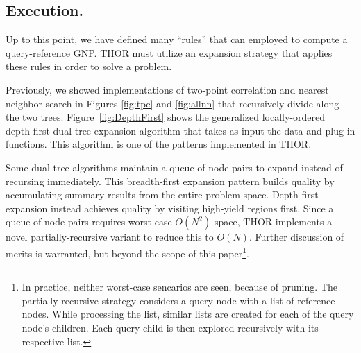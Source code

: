 \documentclass[twoside,leqno,twocolumn]{article}
\newcommand{\summary}{\delta}
\newcommand{\fig}[1]{Figure~\ref{fig:#1}}
\newcommand{\mysub}[1]{\subsection{#1.}}
\newcommand{\lettermu}{e}
\newcommand{\deltamu}{\summary_{\lettermu}}
\begin{document}

\mysub{Execution}

Up to this point, we have defined many ``rules'' that can employed to compute a query-reference GNP.
THOR must utilize an expansion strategy that applies these rules in order to solve a problem.

Previously, we showed implementations of two-point correlation and nearest neighbor search in Figures \ref{fig:tpc} and \ref{fig:allnn} that recursively divide along the two trees.
\fig{DepthFirst} shows the generalized locally-ordered depth-first dual-tree expansion algorithm that takes as input the data and plug-in functions.
This algorithm is one of the patterns implemented in THOR.

Some dual-tree algorithms maintain a queue of node pairs to expand instead of recursing immediately.
This breadth-first expansion pattern builds quality by accumulating summary results from the entire problem space.
Depth-first expansion instead achieves quality by visiting high-yield regions first.
Since a queue of node pairs requires worst-case $O(N^2)$ space, THOR implements a novel partially-recursive variant to reduce this to $O(N)$.
Further discussion of merits is warranted, but beyond the scope of this paper\footnote{
  In practice, neither worst-case sencarios are seen, because of pruning.
  The partially-recursive strategy considers a query node with a list of reference nodes.
  While processing the list, similar lists are created for each of the query node's children.
  Each query child is then explored recursively with its respective list.}.
\end{document}
